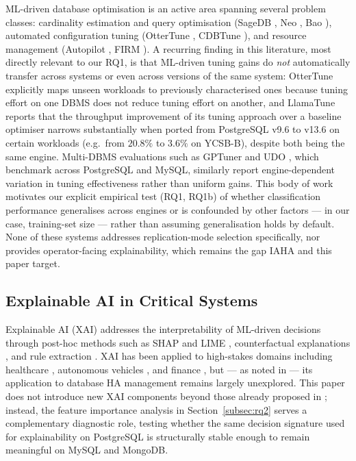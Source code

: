 \documentclass[pdflatex,sn-mathphys-num]{sn-jnl}
\theoremstyle{thmstyleone}
\theoremstyle{thmstylethree}
\begin{document}
ML-driven database optimisation is an active area spanning several
problem classes: cardinality estimation and query optimisation
(SageDB \cite{kraska2019}, Neo \cite{marcus2019}, Bao \cite{marcus2021}),
automated configuration tuning
(OtterTune \cite{vanaken2017}, CDBTune \cite{zhang2019}), and resource
management (Autopilot \cite{autopilot2020}, FIRM \cite{firm2020}). A
recurring finding in this literature, most directly relevant to our
RQ1, is that ML-driven tuning gains do \emph{not} automatically
transfer across systems or even across versions of the same system:
OtterTune \cite{vanaken2017} explicitly maps unseen workloads to
previously characterised ones because tuning effort on one DBMS does
not reduce tuning effort on another, and LlamaTune \cite{kanellis2022}
reports that the throughput improvement of its tuning approach over a
baseline optimiser narrows substantially when ported from PostgreSQL
v9.6 to v13.6 on certain workloads (e.g.\ from $20.8\%$ to $3.6\%$ on
YCSB-B), despite both being the same engine. Multi-DBMS evaluations
such as GPTuner \cite{lao2024} and UDO \cite{wang2021udo}, which
benchmark across PostgreSQL and MySQL, similarly report
engine-dependent variation in tuning effectiveness rather than uniform
gains. This body of work motivates our explicit empirical test (RQ1,
RQ1b) of whether classification performance generalises across engines
or is confounded by other factors --- in our case, training-set
size --- rather than assuming generalisation holds by default. None of
these systems addresses replication-mode selection specifically, nor
provides operator-facing explainability, which remains the gap
IAHA \cite{iaha2026} and this paper target.

\subsection{Explainable AI in Critical Systems}\label{subsec:xai}

Explainable AI (XAI) addresses the interpretability of ML-driven
decisions \cite{gunning2019} through post-hoc methods such as
SHAP \cite{lundberg2017} and LIME \cite{ribeiro2016}, counterfactual
explanations \cite{wachter2017}, and rule extraction \cite{guidotti2018}.
XAI has been applied to high-stakes domains including
healthcare \cite{holzinger2019}, autonomous vehicles \cite{atakishiyev2021},
and finance \cite{bussmann2020}, but --- as noted in \cite{iaha2026}
--- its application to database HA management remains largely
unexplored. This paper does not introduce new XAI components beyond
those already proposed in \cite{iaha2026}; instead, the feature
importance analysis in Section~\ref{subsec:rq2} serves a
complementary diagnostic role, testing whether the same decision
signature used for explainability on PostgreSQL is structurally stable
enough to remain meaningful on MySQL and MongoDB.
\end{document}
